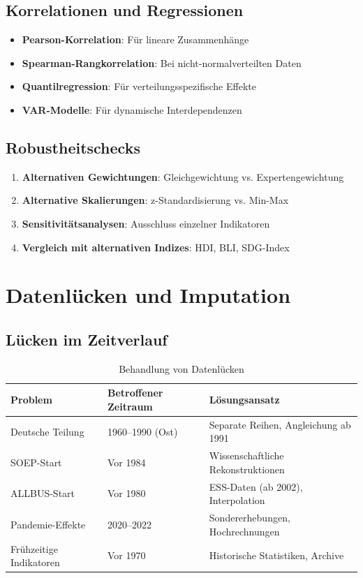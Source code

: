 \subsection{Korrelationen und Regressionen}

\begin{itemize}
    \item \textbf{Pearson-Korrelation}: Für lineare Zusammenhänge
    \item \textbf{Spearman-Rangkorrelation}: Bei nicht-normalverteilten Daten
    \item \textbf{Quantilregression}: Für verteilungsspezifische Effekte
    \item \textbf{VAR-Modelle}: Für dynamische Interdependenzen
\end{itemize}

\subsection{Robustheitschecks}

\begin{enumerate}
    \item \textbf{Alternativen Gewichtungen}: Gleichgewichtung vs. Expertengewichtung
    \item \textbf{Alternative Skalierungen}: z-Standardisierung vs. Min-Max
    \item \textbf{Sensitivitätsanalysen}: Ausschluss einzelner Indikatoren
    \item \textbf{Vergleich mit alternativen Indizes}: HDI, BLI, SDG-Index
\end{enumerate}

\section{Datenlücken und Imputation}

\subsection{Lücken im Zeitverlauf}

\begin{table}[ht]
    \centering
    \caption{Behandlung von Datenlücken}
    \label{tab:datenluecken}
    \begin{tabular}{llp{8cm}}
        \toprule
        \textbf{Problem} & \textbf{Betroffener Zeitraum} & \textbf{Lösungsansatz} \\
        \midrule
        Deutsche Teilung & 1960–1990 (Ost) & Separate Reihen, Angleichung ab 1991 \\
        SOEP-Start & Vor 1984 & Wissenschaftliche Rekonstruktionen \\
        ALLBUS-Start & Vor 1980 & ESS-Daten (ab 2002), Interpolation \\
        Pandemie-Effekte & 2020–2022 & Sondererhebungen, Hochrechnungen \\
        Frühzeitige Indikatoren & Vor 1970 & Historische Statistiken, Archive \\
        \bottomrule
    \end{tabular}
\end{table}


